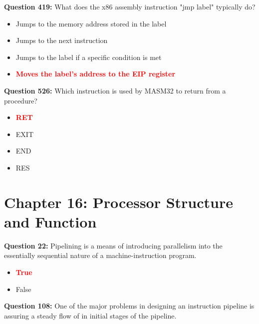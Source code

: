\documentclass[12pt,a4paper]{article}
\begin{document}
\vspace{0.5cm}

\textbf{Question 419:} What does the x86 assembly instruction "jmp label" typically do?

\begin{itemize}
    \item[\textbf{A.}] Jumps to the memory address stored in the label
    \item[\textbf{B.}] Jumps to the next instruction
    \item[\textbf{C.}] Jumps to the label if a specific condition is met
    \item[\textbf{D.}] \textcolor{red}{\textbf{Moves the label's address to the EIP register}}
\end{itemize}

\vspace{0.5cm}

\textbf{Question 526:} Which instruction is used by MASM32 to return from a procedure?

\begin{itemize}
    \item[\textbf{A.}] \textcolor{red}{\textbf{RET}}
    \item[\textbf{B.}] EXIT
    \item[\textbf{C.}] END
    \item[\textbf{D.}] RES
\end{itemize}

\vspace{0.5cm}

\section{Chapter 16: Processor Structure and Function}

\textbf{Question 22:} Pipelining is a means of introducing parallelism into the essentially sequential nature of a machine-instruction program.

\begin{itemize}
    \item[\textbf{A.}] \textcolor{red}{\textbf{True}}
    \item[\textbf{B.}] False
\end{itemize}

\vspace{0.5cm}

\textbf{Question 108:} One of the major problems in designing an instruction pipeline is assuring a steady flow of in initial stages of the pipeline.
\end{document}
